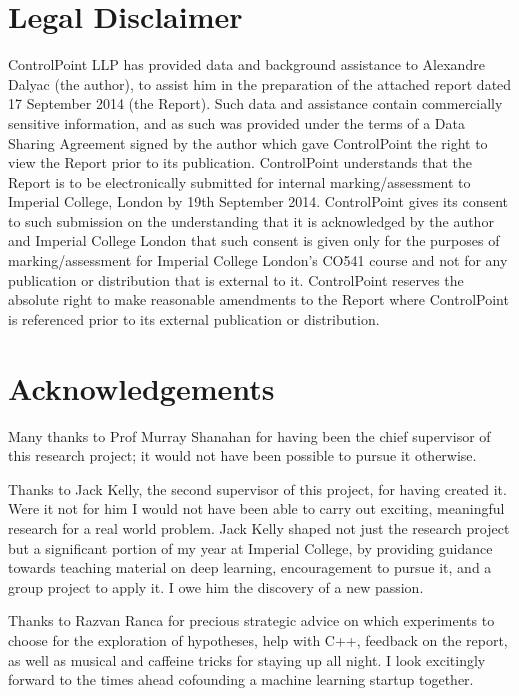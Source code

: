 \documentclass[a4paper,11pt]{article}
\begin{document}
\clearpage
\section{Legal Disclaimer}

ControlPoint LLP has provided data and background assistance to Alexandre Dalyac (the author), to assist him in the preparation of the attached report dated 17 September 2014 (the Report). Such data and assistance contain commercially sensitive information, and as such was provided under the terms of a Data Sharing Agreement signed by the author which gave ControlPoint the right to view the Report prior to its publication.
ControlPoint understands that the Report is to be electronically submitted for internal marking/assessment to Imperial College, London by 19th September 2014.
ControlPoint gives its consent to such submission on the understanding that it is acknowledged by the author and Imperial College London that such consent is given only for the purposes of marking/assessment for Imperial College London's CO541 course and not for any publication or distribution that is external to it.  ControlPoint reserves the absolute right to make reasonable amendments to the Report where ControlPoint is referenced prior to its external publication or distribution.

\clearpage

\tableofcontents

\clearpage

\section{Acknowledgements}

Many thanks to Prof Murray Shanahan for having been the chief supervisor of this research project; it would not have been possible to pursue it otherwise. 

Thanks to Jack Kelly, the second supervisor of this project, for having created it. Were it not for him I would not have been able to carry out exciting, meaningful research for a real world problem. Jack Kelly shaped not just the research project but a significant portion of my year at Imperial College, by providing guidance towards teaching material on deep learning, encouragement to pursue it, and a group project to apply it. I owe him the discovery of a new passion.

Thanks to Razvan Ranca for precious strategic advice on which experiments to choose for the exploration of hypotheses, help with C++, feedback on the report, as well as musical and caffeine tricks for staying up all night. I look excitingly forward to the times ahead cofounding a machine learning startup together.
\end{document}
